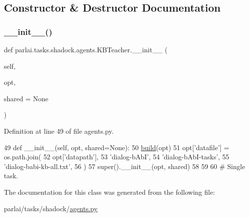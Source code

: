 \subsection{Constructor \& Destructor Documentation}
\mbox{\label{classparlai_1_1tasks_1_1shadock_1_1agents_1_1KBTeacher_a4d1a61f6ca5d3aeea18b629573ea382e}} 
\subsubsection{\texorpdfstring{\+\_\+\+\_\+init\+\_\+\+\_\+()}{\_\_init\_\_()}}
{\footnotesize\ttfamily def parlai.\+tasks.\+shadock.\+agents.\+K\+B\+Teacher.\+\_\+\+\_\+init\+\_\+\+\_\+ (\begin{DoxyParamCaption}\item[{}]{self,  }\item[{}]{opt,  }\item[{}]{shared = {\ttfamily None} }\end{DoxyParamCaption})}



Definition at line 49 of file agents.\+py.


\begin{DoxyCode}
49     \textcolor{keyword}{def }\_\_init\_\_(self, opt, shared=None):
50         \hyperlink{namespaceparlai_1_1mturk_1_1tasks_1_1talkthewalk_1_1download_a8c0fbb9b6dfe127cb8c1bd6e7c4e33fd}{build}(opt)
51         opt[\textcolor{stringliteral}{'datafile'}] = os.path.join(
52             opt[\textcolor{stringliteral}{'datapath'}],
53             \textcolor{stringliteral}{'dialog-bAbI'},
54             \textcolor{stringliteral}{'dialog-bAbI-tasks'},
55             \textcolor{stringliteral}{'dialog-babi-kb-all.txt'},
56         )
57         super().\_\_init\_\_(opt, shared)
58 
59 
60 \textcolor{comment}{# Single task.}
\end{DoxyCode}


The documentation for this class was generated from the following file\+:\begin{DoxyCompactItemize}
\item 
parlai/tasks/shadock/\hyperlink{parlai_2tasks_2shadock_2agents_8py}{agents.\+py}\end{DoxyCompactItemize}
